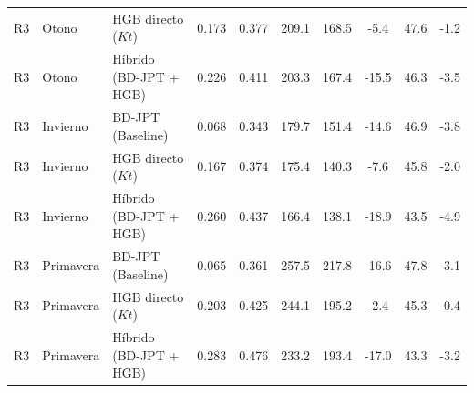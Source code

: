 \documentclass[../main.tex]{subfiles}
\begin{document}
\begin{table}[!ht]
{\begin{tabular}{l l l c c c c c c c}
R3 & Otono & HGB directo ($Kt$) & 0.173 & 0.377 & 209.1 & 168.5 & -5.4 & 47.6 & -1.2 \\
R3 & Otono & Híbrido (BD-JPT + HGB) & 0.226 & 0.411 & 203.3 & 167.4 & -15.5 & 46.3 & -3.5 \\
R3 & Invierno & BD-JPT (Baseline) & 0.068 & 0.343 & 179.7 & 151.4 & -14.6 & 46.9 & -3.8 \\
R3 & Invierno & HGB directo ($Kt$) & 0.167 & 0.374 & 175.4 & 140.3 & -7.6 & 45.8 & -2.0 \\
R3 & Invierno & Híbrido (BD-JPT + HGB) & 0.260 & 0.437 & 166.4 & 138.1 & -18.9 & 43.5 & -4.9 \\
R3 & Primavera & BD-JPT (Baseline) & 0.065 & 0.361 & 257.5 & 217.8 & -16.6 & 47.8 & -3.1 \\
R3 & Primavera & HGB directo ($Kt$) & 0.203 & 0.425 & 244.1 & 195.2 & -2.4 & 45.3 & -0.4 \\
R3 & Primavera & Híbrido (BD-JPT + HGB) & 0.283 & 0.476 & 233.2 & 193.4 & -17.0 & 43.3 & -3.2 \\
\bottomrule
\end{tabular}
}
\end{table}
\end{document}
